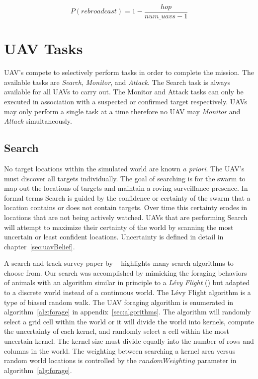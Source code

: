\begin{equation}
\label{eq:probFlood}
P(rebroadcast) = 1 - \frac{hop}{num\_uavs - 1}
\end{equation}

\section{UAV Tasks}
UAV's compete to selectively perform tasks in order to complete the mission.  The available tasks are \textit{Search}, \textit{Monitor}, and \textit{Attack}.  The Search task is always available for all UAVs to carry out.  The Monitor and Attack tasks can only be executed in association with a suspected or confirmed target respectively.  UAVs may only perform a single task at a time therefore no UAV may \textit{Monitor} and \textit{Attack} simultaneously.

\subsection{Search}
No target locations within the simulated world are known \textit{a priori}.  The UAV's must discover all targets individually.  The goal of searching is for the swarm to map out the locations of targets and maintain a roving surveillance presence. In formal terms Search is guided by the confidence or certainty of the swarm that a location contains or does not contain targets.  Over time this certainty erodes in locations that are not being actively watched.  UAVs that are performing Search will attempt to maximize their certainty of the world by scanning the most uncertain or least confident locations.  Uncertainty is defined in detail in chapter~\ref{sec:uavBelief}.

A search-and-track survey paper by ~\cite{senanayake} highlights many search algorithms to choose from. Our search was accomplished by mimicking the foraging behaviors of animals with an algorithm similar in principle to a \textit{L\'evy Flight} (\cite{humphries}) but adapted to a discrete world instead of a continuous world.  The L\'evy Flight algorithm is a type of biased random walk.  The UAV foraging algorithm is enumerated in algorithm~\ref{alg:forage} in appendix~\ref{sec:algorithms}.  The algorithm will randomly select a grid cell within the world or it will divide the world into kernels, compute the uncertainty of each kernel, and randomly select a cell within the most uncertain kernel.  The kernel size must divide equally into the number of rows and columns in the world.  The weighting between searching a kernel area versus random world locations is controlled by the $randomWeighting$ parameter in algorithm~\ref{alg:forage}.


